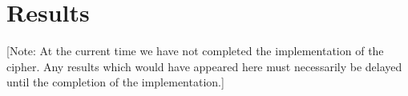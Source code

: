 \section{Results}

[Note: At the current time we have not completed the implementation of the cipher. Any results which would have appeared here must necessarily be delayed until the completion of the implementation.]